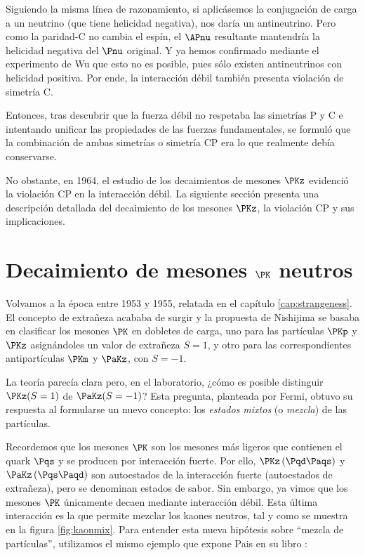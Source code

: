 Siguiendo la misma línea de razonamiento, si aplicásemos la conjugación de carga a un neutrino (que tiene helicidad negativa), nos daría un antineutrino. Pero como la paridad-C no cambia el espín, el $\APnu$ resultante mantendría la helicidad negativa del $\Pnu$ original. Y ya hemos confirmado mediante el experimento de Wu que esto no es posible, pues sólo existen antineutrinos con helicidad positiva. Por ende, la interacción débil también presenta violación de simetría C.

Entonces, tras descubrir que la fuerza débil no respetaba las simetrías P y C e intentando unificar las propiedades de las fuerzas fundamentales, se formuló que la combinación de ambas simetrías o simetría CP era lo que realmente debía conservarse.

No obstante, en 1964, el estudio de los decaimientos de mesones $\PKz$ evidenció la violación CP en la interacción débil. La siguiente sección presenta una descripción detallada del decaimiento de los mesones $\PKz$, la violación CP y sus implicaciones.

\section{Decaimiento de mesones $\PK$ neutros}
\label{sec:neutral_kaon_decay}

Volvamos a la época entre 1953 y 1955, relatada en el capítulo \ref{cap:strangeness}. El concepto de extrañeza acababa de surgir y la propuesta de Nishijima se basaba en clasificar los mesones $\PK$ en dobletes de carga, uno para las partículas $\PKp$ y $\PKz$ asignándoles un valor de extrañeza $S=1$, y otro para las correspondientes antipartículas $\PKm$ y $\PaKz$, con $S=-1$.

La teoría parecía clara pero, en el laboratorio, ¿cómo es posible distinguir $\PKz(S=1)$ de $\PaKz(S=-1)$? Esta pregunta, planteada por Fermi, obtuvo su respuesta al formularse un nuevo concepto: los \textit{estados mixtos} (o \textit{mezcla}) de las partículas.

Recordemos que los mesones $\PK$ son los mesones más ligeros que contienen el quark $\Pqs$ y se producen por interacción fuerte. Por ello, $\PKz\left(\Pqd\Paqs\right) $ y $\PaKz\left(\Pqs\Paqd\right)$ son autoestados de la interacción fuerte (autoestados de extrañeza), pero se denominan estados de sabor. Sin embargo, ya vimos que los mesones $\PK$ únicamente decaen mediante interacción débil. Esta última interacción es la que permite mezclar los kaones neutros, tal y como se muestra en la figura \ref{fig:kaonmix}. Para entender esta nueva hipótesis sobre ``mezcla de partículas'', utilizamos el mismo ejemplo que expone Pais en su libro \cite{Pais}:


